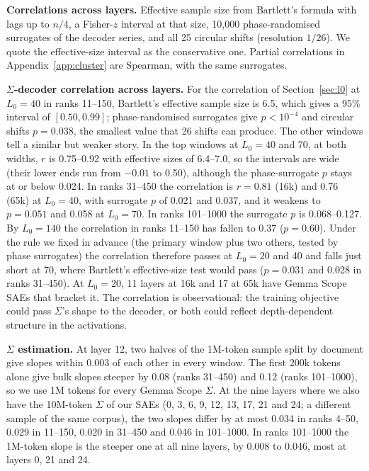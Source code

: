 \documentclass{article}
\newcommand{\Sig}{\Sigma}
\newcommand{\Lz}{L_0}
\begin{document}
\textbf{Correlations across layers.} Effective sample size from Bartlett's formula with lags up to $n/4$, a Fisher-$z$ interval at that size, 10,000 phase-randomised surrogates of the decoder series, and all 25 circular shifts (resolution $1/26$). We quote the effective-size interval as the conservative one. Partial correlations in Appendix~\ref{app:cluster} are Spearman, with the same surrogates.

\textbf{$\Sig$-decoder correlation across layers.}
\label{app:corr}
For the correlation of Section~\ref{sec:l0} at $\Lz=40$ in ranks 11--150, Bartlett's effective sample size is 6.5, which gives a 95\% interval of $[0.50, 0.99]$; phase-randomised surrogates give $p<10^{-4}$ and circular shifts $p=0.038$, the smallest value that 26 shifts can produce. The other windows tell a similar but weaker story. In the top windows at $\Lz=40$ and 70, at both widths, $r$ is 0.75--0.92 with effective sizes of 6.4--7.0, so the intervals are wide (their lower ends run from $-0.01$ to 0.50), although the phase-surrogate $p$ stays at or below 0.024. In ranks 31--450 the correlation is $r=0.81$ (16k) and 0.76 (65k) at $\Lz=40$, with surrogate $p$ of 0.021 and 0.037, and it weakens to $p=0.051$ and 0.058 at $\Lz=70$. In ranks 101--1000 the surrogate $p$ is 0.068--0.127. By $\Lz=140$ the correlation in ranks 11--150 has fallen to 0.37 ($p=0.60$). Under the rule we fixed in advance (the primary window plus two others, tested by phase surrogates) the correlation therefore passes at $\Lz=20$ and 40 and falls just short at 70, where Bartlett's effective-size test would pass ($p=0.031$ and 0.028 in ranks 31--450). At $\Lz=20$, 11 layers at 16k and 17 at 65k have Gemma Scope SAEs that bracket it. The correlation is observational: the training objective could pass $\Sig$'s shape to the decoder, or both could reflect depth-dependent structure in the activations.

\textbf{$\Sig$ estimation.} At layer 12, two halves of the 1M-token sample split by document give slopes within 0.003 of each other in every window. The first 200k tokens alone give bulk slopes steeper by 0.08 (ranks 31--450) and 0.12 (ranks 101--1000), so we use 1M tokens for every Gemma Scope $\Sig$. At the nine layers where we also have the 10M-token $\Sig$ of our SAEs (0, 3, 6, 9, 12, 13, 17, 21 and 24; a different sample of the same corpus), the two slopes differ by at most 0.034 in ranks 4--50, 0.029 in 11--150, 0.020 in 31--450 and 0.046 in 101--1000. In ranks 101--1000 the 1M-token slope is the steeper one at all nine layers, by 0.008 to 0.046, most at layers 0, 21 and 24.
\end{document}
